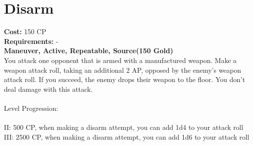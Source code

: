 \section{Disarm}
\textbf{Cost:} 150 CP\\
\textbf{Requirements:} -\\
\textbf{Maneuver, Active, Repeatable, Source(150 Gold)}\\
You attack one opponent that is armed with a manufactured weapon. Make a weapon attack roll, taking an additional 2 AP, opposed by the enemy's weapon attack roll. If you succeed, the enemy drops their weapon to the floor. You don't deal damage with this attack.\\
\\
Level Progression:\\
\\
II: 500 CP, when making a disarm attempt, you can add 1d4 to your attack roll\\ 
III: 2500 CP, when making a disarm attempt, you can add 1d6 to your attack roll\\